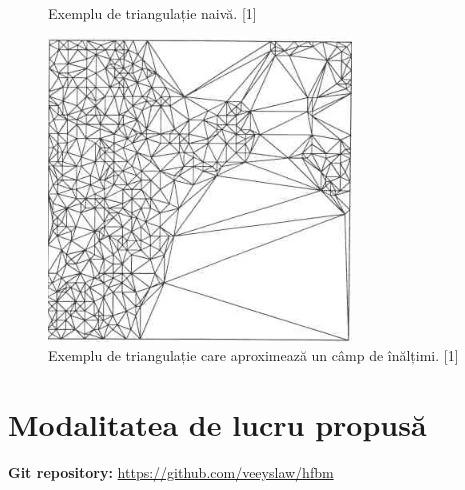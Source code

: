 \documentclass[12pt]{article}
\begin{document}
\begin{figure}[!htb]
\begin{minipage}{0.32\textwidth}
		\caption{Exemplu de triangulație naivă. [1]}\label{fig:fig2}
	\end{minipage}\hfill
	\begin{minipage}{0.32\textwidth}
		\centering
		\includegraphics[width=.7\linewidth]{ExempluTriangulatieCuAproximari.png}
		\caption{Exemplu de triangulație care aproximează un câmp de înălțimi. [1]}\label{fig:fig3}
	\end{minipage}
\end{figure}

\newpage
\vspace{10cm}
\section{Modalitatea de lucru propusă}%

\textbf{Git repository:} \url{https://github.com/veeyslaw/hfbm}
\end{document}
